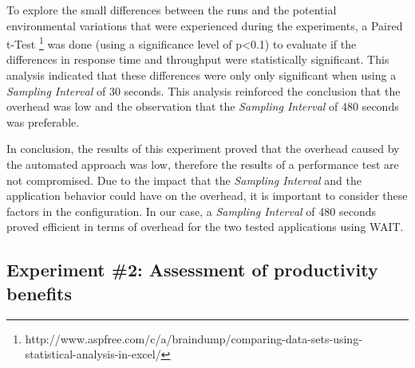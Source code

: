 \documentclass[runningheads,a4paper]{llncs}
\newcommand{\myspaceM}{-7.6pt}
\begin{document}
To explore the small differences between the runs and the potential
environmental variations that were experienced during the experiments, a Paired
t-Test
\footnote{http://www.aspfree.com/c/a/braindump/comparing-data-sets-using-statistical-analysis-in-excel/}
 was done (using a significance level of p\textless0.1) to evaluate if the
differences in response time and throughput were statistically significant.
This analysis indicated that these differences were only only significant when
using a \emph{Sampling Interval} of 30 seconds. This analysis reinforced 
the conclusion that the overhead was low and the observation that the
\emph{Sampling Interval} of 480 seconds was preferable.

In conclusion, the results of this experiment proved that the
overhead caused by the automated approach was low, therefore the results of a
performance test are not compromised. Due to the impact that the \emph{Sampling
Interval} and the application behavior could have on the overhead, it is important to 
consider these factors in the configuration. In our case, a \emph{Sampling
Interval} of 480 seconds proved efficient in terms of overhead for the two tested applications using WAIT.

\vspace{\myspaceM{}}
\subsection{Experiment \#2: Assessment of productivity benefits}
\label{Experiment_2_Results}
\vspace{\myspaceM{}}


\end{document}
